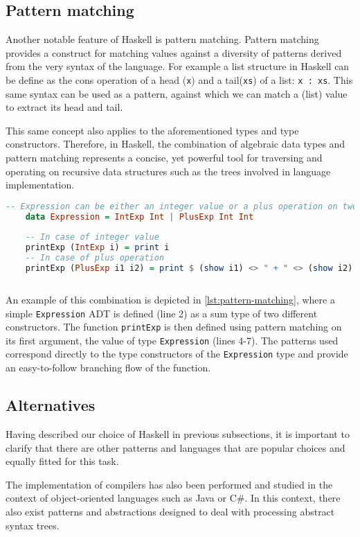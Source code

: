 \subsection{Pattern matching}
Another notable feature of Haskell is pattern matching. Pattern matching provides a construct for matching values against a diversity of patterns derived from the very syntax of the language.\cite{allen2016haskell} For example a list structure in Haskell can be define as the cons operation of a head (\lstinline{x}) and a tail(\lstinline{xs}) of a list: \lstinline{x : xs}. This same syntax can be used as a pattern, against which we can match a (list) value to extract its head and tail.
\par
This same concept also applies to the aforementioned types and type constructors. Therefore, in Haskell, the combination of algebraic data types and pattern matching represents a concise, yet powerful tool for traversing and operating on recursive data structures such as the trees involved in language implementation.
\begin{lstlisting}[language=Haskell,float=h,
caption=Example of pattern matching on algebraic data types in Haskell,
label=lst:pattern-matching]
    -- Expression can be either an integer value or a plus operation on two integers
    data Expression = IntExp Int | PlusExp Int Int
    
    -- In case of integer value
    printExp (IntExp i) = print i
    -- In case of plus operation
    printExp (PlusExp i1 i2) = print $ (show i1) <> " + " <> (show i2)
\end{lstlisting}
\begin{verbatim}
\end{verbatim}

An example of this combination is depicted in \cref{lst:pattern-matching}, where a simple \lstinline{Expression} ADT is defined (line 2) as a sum type of two different constructors. The function \lstinline{printExp} is then defined using pattern matching on its first argument, the value of type \lstinline{Expression} (lines 4-7). The patterns used correspond directly to the type constructors of the \lstinline{Expression} type and provide an easy-to-follow branching flow of the function.
\par 
\subsection{Alternatives}
Having described our choice of Haskell in previous subsections, it is important to clarify that there are other patterns and languages that are popular choices and equally fitted for this task. 
\par
The implementation of compilers has also been performed and studied in the context of object-oriented languages such as Java or C\#. In this context, there also exist patterns and abstractions designed to deal with processing abstract syntax trees.
